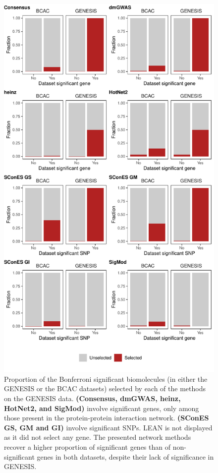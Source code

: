 \documentclass[
  11pt,
]{env/yjiao}
\begin{document}
\begin{figure}

{\centering \includegraphics[height=0.8\textheight]{fig/sfigure_4} 

}

\caption{Proportion of the Bonferroni significant biomolecules (in either the GENESIS or the BCAC datasets) selected by each of the methods on the GENESIS data. \textbf{(Consensus, dmGWAS, heinz, HotNet2, and SigMod)} involve significant genes, only among those present in the protein-protein interaction network. \textbf{(SConES GS, GM and GI)} involve significant SNPs. LEAN is not displayed as it did not select any gene. The presented network methods recover a higher proportion of significant genes than of non-significant genes in both datasets, despite their lack of significance in GENESIS.}\label{fig:bcac-comparison}
\end{figure}
\end{document}
